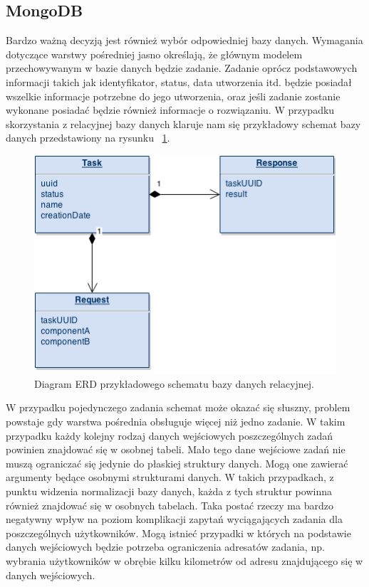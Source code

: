 \subsection{MongoDB}

Bardzo ważną decyzją jest również wybór odpowiedniej bazy danych. Wymagania dotyczące warstwy pośredniej jasno określają, że głównym modelem przechowywanym w bazie danych będzie zadanie. Zadanie oprócz podstawowych informacji takich jak identyfikator, status, data utworzenia itd. będzie posiadał wszelkie informacje potrzebne do jego utworzenia, oraz jeśli zadanie zostanie wykonane posiadać będzie również informacje o rozwiązaniu. W przypadku skorzystania z relacyjnej bazy danych klaruje nam się przykładowy schemat bazy danych przedstawiony na rysunku ~\ref{fig:erd}.

\begin{figure}[h]
\centerline{\includegraphics[scale=0.7]{erd}}
\caption{Diagram ERD przykładowego schematu bazy danych relacyjnej.}
\label{fig:erd}
\end{figure}

W przypadku pojedynczego zadania schemat może okazać się słuszny, problem powstaje gdy warstwa pośrednia obsługuje więcej niż jedno zadanie. W takim przypadku każdy kolejny rodzaj danych wejściowych poszczególnych zadań powinien znajdować się w osobnej tabeli. Mało tego dane wejściowe zadań nie muszą ograniczać się jedynie do płaskiej struktury danych. Mogą one zawierać argumenty będące osobnymi strukturami danych. W takich przypadkach, z punktu widzenia normalizacji bazy danych, każda z tych struktur powinna również znajdować się w osobnych tabelach.  Taka postać rzeczy ma bardzo negatywny wpływ na poziom komplikacji zapytań wyciągających zadania dla poszczególnych użytkowników. Mogą istnieć przypadki w których na podstawie danych wejściowych będzie potrzeba ograniczenia adresatów zadania, np. wybrania użytkowników w obrębie kilku kilometrów od adresu znajdującego się w danych wejściowych. 

